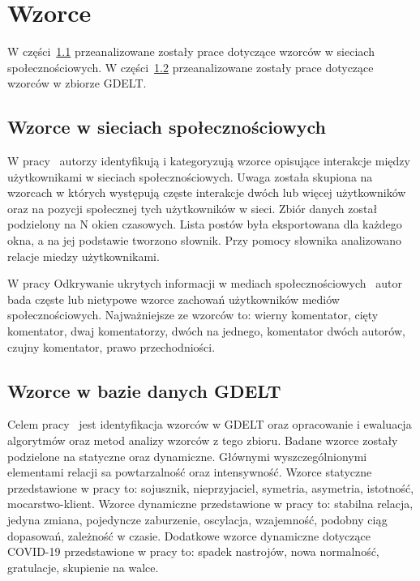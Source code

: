 \documentclass[11pt]{report}
\begin{document}
    \section{Wzorce}\label{sec:wzorce}
    W części~\ref{subsec:wzorce-w-sieciach-społecznościowych} przeanalizowane zostały prace dotyczące wzorców w sieciach społecznościowych.
    W części~\ref{subsec:wzorce-gdelt} przeanalizowane zostały prace dotyczące wzorców w zbiorze GDELT\@.

    \subsection{Wzorce w sieciach społecznościowych}\label{subsec:wzorce-w-sieciach-społecznościowych}
    W pracy~\cite{10.1093/jigpal/jzaa042} autorzy identyfikują i kategoryzują wzorce opisujące interakcje między użytkownikami w sieciach społecznościowych.
    Uwaga została skupiona na wzorcach w których występują częste interakcje dwóch lub więcej użytkowników oraz na pozycji społecznej tych użytkowników w sieci.
    Zbiór danych został podzielony na N okien czasowych.
    Lista postów była eksportowana dla każdego okna, a na jej podstawie tworzono słownik.
    Przy pomocy słownika analizowano relacje miedzy użytkownikami.

    W pracy Odkrywanie ukrytych informacji w mediach społecznościowych~\cite{Skwara2019} autor bada częste lub nietypowe wzorce zachowań użytkowników mediów społecznościowych.
    Najważniejsze ze wzorców to: wierny komentator, cięty komentator, dwaj komentatorzy, dwóch na jednego, komentator dwóch autorów, czujny komentator, prawo przechodniości.

    \subsection{Wzorce w bazie danych GDELT}\label{subsec:wzorce-gdelt}
    Celem pracy~\cite{Jarosz2020} jest identyfikacja wzorców w GDELT oraz opracowanie i ewaluacja algorytmów oraz metod analizy wzorców z tego zbioru.
    Badane wzorce zostały podzielone na statyczne oraz dynamiczne.
    Głównymi wyszczególnionymi elementami relacji sa powtarzalność oraz intensywność.
    Wzorce statyczne przedstawione w pracy to: sojusznik, nieprzyjaciel, symetria, asymetria, istotność, mocarstwo-klient.
    Wzorce dynamiczne przedstawione w pracy to: stabilna relacja, jedyna zmiana, pojedyncze zaburzenie, oscylacja, wzajemność, podobny ciąg dopasowań, zależność w czasie.
    Dodatkowe wzorce dynamiczne dotyczące COVID-19 przedstawione w pracy to: spadek nastrojów, nowa normalność, gratulacje, skupienie na walce.
\end{document}

